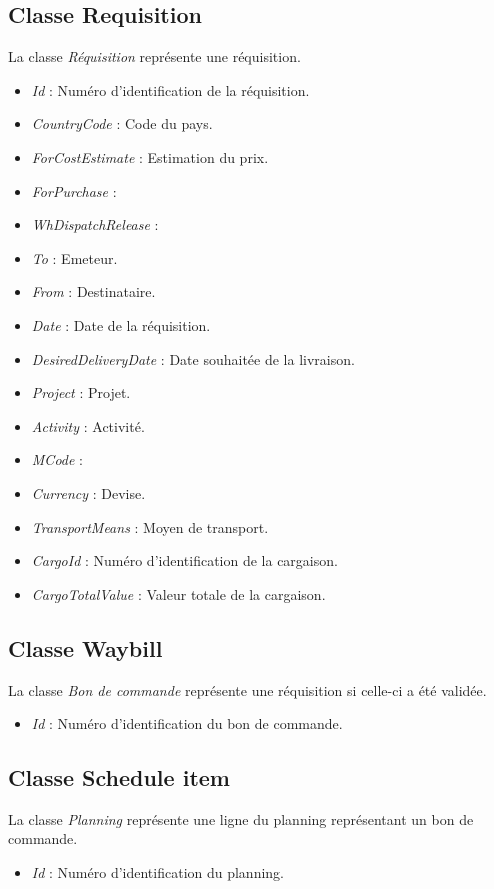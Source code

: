 \subsection{Classe Requisition}
La classe \textit{Réquisition} représente une réquisition.
\begin{itemize}
	\item \textit{Id} : Numéro d'identification de la réquisition.
	\item \textit{CountryCode} : Code du pays.
	\item \textit{ForCostEstimate} : Estimation du prix.
	\item \textit{ForPurchase} :
	\item \textit{WhDispatchRelease} :
	\item \textit{To} : Emeteur.
	\item \textit{From} : Destinataire.
	\item \textit{Date} : Date de la réquisition.
	\item \textit{DesiredDeliveryDate} : Date souhaitée de la livraison.
	\item \textit{Project} : Projet.
	\item \textit{Activity} : Activité.
	\item \textit{MCode} :
	\item \textit{Currency} : Devise.
	\item \textit{TransportMeans} : Moyen de transport.
	\item \textit{CargoId} : Numéro d'identification de la cargaison.
	\item \textit{CargoTotalValue} : Valeur totale de la cargaison.
\end{itemize}

\subsection{Classe Waybill}
La classe \textit{Bon de commande} représente une réquisition si celle-ci a été validée.
\begin{itemize}
	\item \textit{Id} : Numéro d'identification du bon de commande.
\end{itemize}

\subsection{Classe Schedule item}
La classe \textit{Planning} représente une ligne du planning représentant un bon de commande.
\begin{itemize}
	\item \textit{Id} : Numéro d'identification du planning.
\end{itemize}